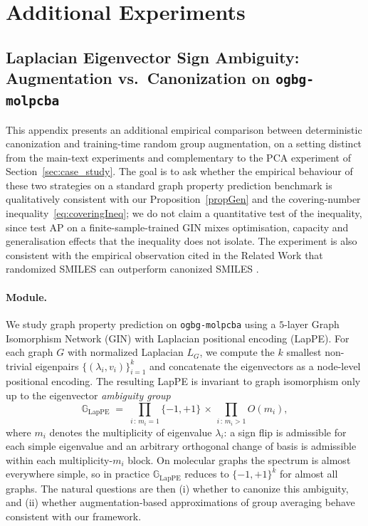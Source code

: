 \documentclass{article}
\theoremstyle{definition}
\theoremstyle{plain}
\newcommand{\G}{\mathbb{G}}
\begin{document}
\section{Additional Experiments}
\label{app:additional_exp}

\subsection{Laplacian Eigenvector Sign Ambiguity: Augmentation vs.\ Canonization on \texttt{ogbg-molpcba}}
\label{subsec:lpe_molpcba}

This appendix presents an additional empirical comparison between deterministic
canonization and training-time random group augmentation, on a setting
distinct from the main-text experiments and complementary to the PCA
experiment of Section~\ref{sec:case_study}. The goal is to ask whether
the empirical behaviour of these two strategies on a standard graph
property prediction benchmark is qualitatively consistent with our
Proposition~\ref{propGen} and the covering-number inequality~\eqref{eq:coveringIneq};
we do not claim a quantitative test of the inequality, since test AP
on a finite-sample-trained GIN mixes optimisation, capacity and
generalisation effects that the inequality does not isolate. The
experiment is also consistent with the empirical observation cited in
the Related Work that randomized SMILES can outperform canonized SMILES
\cite{ArusPous2019,Bjerrum2017SMILESEA}.

\paragraph{Module.}
We study graph property prediction on \texttt{ogbg-molpcba} using a
$5$-layer Graph Isomorphism Network (GIN) with Laplacian positional
encoding (LapPE). For each graph $G$ with normalized Laplacian
$L_G$, we compute the $k$ smallest non-trivial eigenpairs
$\{(\lambda_i, v_i)\}_{i=1}^{k}$ and concatenate the eigenvectors as a
node-level positional encoding. The resulting LapPE is invariant to
graph isomorphism only up to the eigenvector \emph{ambiguity group}
\[
  \G_{\mathrm{LapPE}} \;=\; \prod_{i\,:\,m_i=1}\{-1,+1\} \,\times\, \prod_{i\,:\,m_i>1} O(m_i),
\]
where $m_i$ denotes the multiplicity of eigenvalue $\lambda_i$: a sign
flip is admissible for each simple eigenvalue and an arbitrary orthogonal
change of basis is admissible within each multiplicity-$m_i$ block. On
molecular graphs the spectrum is almost everywhere simple, so in
practice $\G_{\mathrm{LapPE}}$ reduces to $\{-1,+1\}^{k}$ for almost all
graphs. The natural questions are then (i) whether to canonize this
ambiguity, and (ii) whether augmentation-based approximations of group
averaging behave consistent with our framework.
\end{document}
